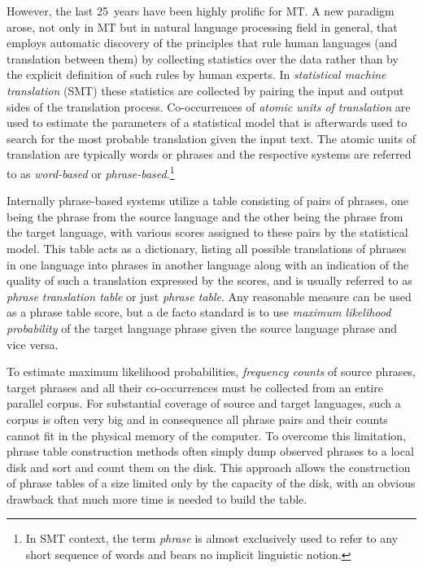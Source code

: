 However, the last 25~years have been highly prolific for MT.
A new paradigm arose, not only in MT but in natural language processing
field in general, that employs automatic discovery of the principles that
rule human languages (and translation between them) by collecting
statistics over the data rather than by the explicit definition of such rules
by human experts.
In \emph{statistical machine translation} (SMT) these statistics are
collected by pairing the input and output sides of the translation process.
Co-occurrences of \emph{atomic units of translation} are used to
estimate the parameters of a statistical model that is afterwards used to
search for the most probable translation given the input text.
The atomic units of translation are typically words or phrases and
the respective systems are referred to as \emph{word-based} or
\emph{phrase-based}.\footnote{In SMT context, the term \emph{phrase} is almost
exclusively used to refer to any short sequence of words and bears no
implicit linguistic notion.}

Internally phrase-based systems utilize a table consisting of pairs of
phrases, one being the phrase from the source language and the other
being the phrase from the target language, with various scores assigned to
these pairs by the statistical model.
This table acts as a dictionary, listing all possible translations of phrases
in one language into phrases in another language along with an indication of
the quality of such a translation expressed by the scores, and is usually referred
to as \emph{phrase translation table} or just \emph{phrase table}.
Any reasonable measure can be used as a phrase table score, but a de facto
standard is to use \emph{maximum likelihood probability} of the target language
phrase given the source language phrase and vice versa.

To estimate maximum likelihood probabilities, \emph{frequency counts} of source
phrases, target phrases and all their co-occurrences must be collected from
an entire parallel corpus.
For substantial coverage of source and target languages, such a corpus is often
very big and in consequence all phrase pairs and their counts cannot fit in
the physical memory of the computer.
To overcome this limitation, phrase table construction methods often simply
dump observed phrases to a local disk and sort and count them on the disk.
This approach allows the construction of phrase tables of a size limited only by
the capacity of the disk, with an obvious drawback that much more time is
needed to build the table.

